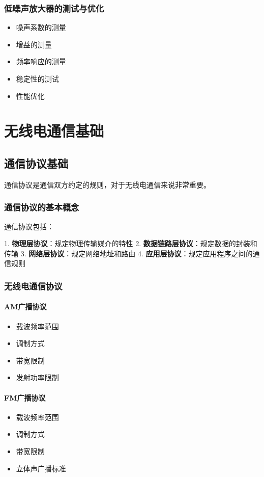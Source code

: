 \documentclass[12pt,UTF8]{ctexbook}
\begin{document}
\section{低噪声放大器的测试与优化}\begin{itemize}
  \item 噪声系数的测量
  \item 增益的测量
  \item 频率响应的测量
  \item 稳定性的测试
  \item 性能优化\end{itemize}

\part{无线电通信基础}

\chapter{通信协议基础}

通信协议是通信双方约定的规则，对于无线电通信来说非常重要。

\section{通信协议的基本概念}

通信协议包括：

1. \textbf{物理层协议}：规定物理传输媒介的特性
2. \textbf{数据链路层协议}：规定数据的封装和传输
3. \textbf{网络层协议}：规定网络地址和路由
4. \textbf{应用层协议}：规定应用程序之间的通信规则

\section{无线电通信协议}

\subsection{AM广播协议}\begin{itemize}
  \item 载波频率范围
  \item 调制方式
  \item 带宽限制
  \item 发射功率限制\end{itemize}

\subsection{FM广播协议}\begin{itemize}
  \item 载波频率范围
  \item 调制方式
  \item 带宽限制
  \item 立体声广播标准\end{itemize}
\end{document}
